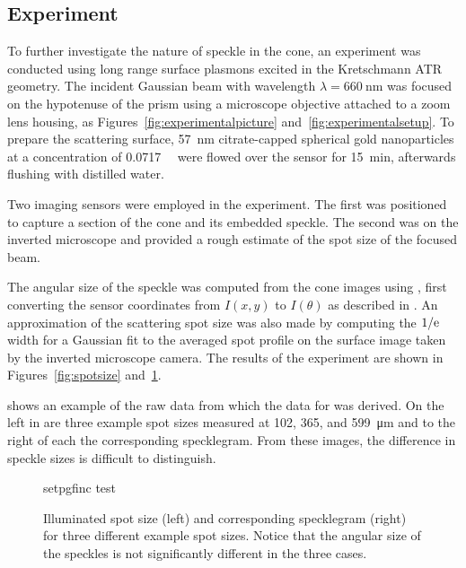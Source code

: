 \subsection{Experiment}\label{sec:specklesizeexpf}
To further investigate the nature of speckle in the cone, an experiment was
conducted using long range surface plasmons excited in the Kretschmann ATR
geometry.  The incident Gaussian beam with wavelength $\lambda =
\SI{660}{\nano\meter}$ was focused on the hypotenuse of the prism using a
microscope objective attached to a zoom lens housing, as
Figures~\ref{fig:experimentalpicture} and~\ref{fig:experimentalsetup}.  To
prepare the scattering surface, \SI{57}{\nano\meter} citrate-capped spherical
gold nanoparticles at a concentration of \SI{0.0717}{\nano\Molar} were flowed
over the sensor for \SI{15}{\minute}, afterwards flushing with distilled
water.

Two imaging sensors were employed in the experiment.  The first was positioned
to capture a section of the cone and its embedded speckle.  The second was on
the inverted microscope and provided a rough estimate of the spot size of the
focused beam.

The angular size of the speckle was computed from the cone images using
, first converting the sensor coordinates from $I(x,y)$
to $I(\theta)$ as described in .  An approximation of the
scattering spot size was also made by computing the $1/{\mathrm{e}}$ width for a
Gaussian fit to the averaged spot profile on the surface image taken by the
inverted microscope camera.  The results of the experiment are shown in
Figures~\ref{fig:spotsize} and~\ref{fig:spotsizewspeckle}.  

 shows an example of the raw data from which the
data for  was derived.  On the left in
 are three example spot sizes measured at 102,
365, and \SI{599}{\micro\meter} and to the right of each the corresponding
specklegram.  From these images, the difference in speckle sizes is difficult
to distinguish.
\begin{figure}[ht]
\centering
{setpgfinc}
{test}
\caption{Illuminated spot size (left) and corresponding specklegram (right)
for three different example spot sizes.  Notice that the angular size of the
speckles is not significantly different in the three cases.}
\label{fig:spotsizewspeckle}
\end{figure}


